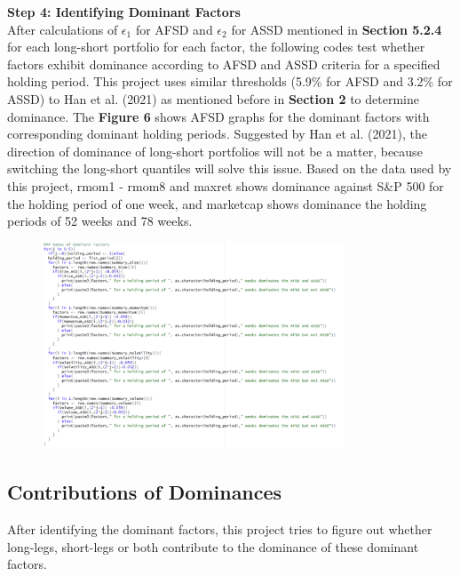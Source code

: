 \documentclass{article}
\begin{document}
\textbf{Step 4: Identifying Dominant Factors}\\
After calculations of $\epsilon_1$ for AFSD and $\epsilon_2$ for ASSD mentioned in {\bf Section 5.2.4} for each long-short portfolio for each factor, the following codes test whether factors exhibit dominance according to AFSD and ASSD criteria for a specified holding period. This project uses similar thresholds (5.9\% for AFSD and 3.2\% for ASSD) to Han et al. (2021) as mentioned before in {\bf Section 2} to determine dominance. The {\bf Figure 6} shows AFSD graphs for the dominant factors with corresponding dominant holding periods. Suggested by Han et al. (2021), the direction of dominance of long-short portfolios will not be a matter, because switching the long-short quantiles will solve this issue. Based on the data used by this project, rmom1 - rmom8 and maxret shows dominance against S\&P 500 for the holding period of one week, and marketcap shows dominance the holding periods of 52 weeks and 78 weeks.
\begin{figure}[H]
    \centering
    \includegraphics[width=0.8\textwidth]{16.png}
    \label{fig:example}
\end{figure}

\hypertarget{Contributions of Dominances}{%
\subsection{Contributions of Dominances}\label{Contributions of Dominances}}

After identifying the dominant factors, this project tries to figure out whether long-legs, short-legs or both contribute to the dominance of these dominant factors.
\end{document}
